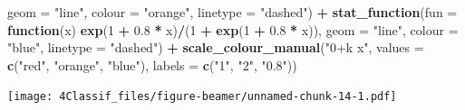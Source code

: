\documentclass[10pt,ignorenonframetext,]{beamer}
\newenvironment{Shaded}{\begin{snugshade}}{\end{snugshade}}
\newcommand{\KeywordTok}[1]{\textcolor[rgb]{0.13,0.29,0.53}{\textbf{#1}}}
\newcommand{\DataTypeTok}[1]{\textcolor[rgb]{0.13,0.29,0.53}{#1}}
\newcommand{\DecValTok}[1]{\textcolor[rgb]{0.00,0.00,0.81}{#1}}
\newcommand{\FloatTok}[1]{\textcolor[rgb]{0.00,0.00,0.81}{#1}}
\newcommand{\StringTok}[1]{\textcolor[rgb]{0.31,0.60,0.02}{#1}}
\newcommand{\ControlFlowTok}[1]{\textcolor[rgb]{0.13,0.29,0.53}{\textbf{#1}}}
\newcommand{\OperatorTok}[1]{\textcolor[rgb]{0.81,0.36,0.00}{\textbf{#1}}}
\newcommand{\NormalTok}[1]{#1}
\begin{document}
\begin{frame}[fragile]
\begin{Shaded}
\begin{Highlighting}[]
        \DataTypeTok{geom =} \StringTok{"line"}\NormalTok{, }\DataTypeTok{colour =} \StringTok{"orange"}\NormalTok{, }\DataTypeTok{linetype =} \StringTok{"dashed"}\NormalTok{) }\OperatorTok{+}\StringTok{ }\KeywordTok{stat_function}\NormalTok{(}\DataTypeTok{fun =} \ControlFlowTok{function}\NormalTok{(x) }\KeywordTok{exp}\NormalTok{(}\DecValTok{1} \OperatorTok{+}\StringTok{ }
\StringTok{    }\FloatTok{0.8} \OperatorTok{*}\StringTok{ }\NormalTok{x)}\OperatorTok{/}\NormalTok{(}\DecValTok{1} \OperatorTok{+}\StringTok{ }\KeywordTok{exp}\NormalTok{(}\DecValTok{1} \OperatorTok{+}\StringTok{ }\FloatTok{0.8} \OperatorTok{*}\StringTok{ }\NormalTok{x)), }\DataTypeTok{geom =} \StringTok{"line"}\NormalTok{, }\DataTypeTok{colour =} \StringTok{"blue"}\NormalTok{, }
    \DataTypeTok{linetype =} \StringTok{"dashed"}\NormalTok{) }\OperatorTok{+}\StringTok{ }\KeywordTok{scale_colour_manual}\NormalTok{(}\StringTok{"0+k x"}\NormalTok{, }\DataTypeTok{values =} \KeywordTok{c}\NormalTok{(}\StringTok{"red"}\NormalTok{, }
    \StringTok{"orange"}\NormalTok{, }\StringTok{"blue"}\NormalTok{), }\DataTypeTok{labels =} \KeywordTok{c}\NormalTok{(}\StringTok{"1"}\NormalTok{, }\StringTok{"2"}\NormalTok{, }\StringTok{"0.8"}\NormalTok{))}
\end{Highlighting}
\end{Shaded}

\texttt{[image: 4Classif\_files/figure-beamer/unnamed-chunk-14-1.pdf]}

\end{frame}
\end{document}
